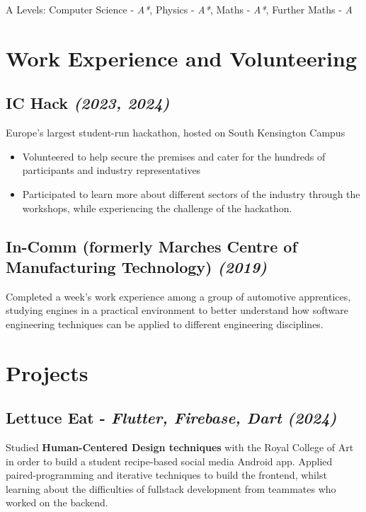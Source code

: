 \documentclass{article}
\newcommand{\dates}[1]{\hfill\textit{(#1)}}
\newcommand{\alevel}[2]{#1 - \textit{#2}}
\newcommand{\tab}{\hspace{1em}}
\newcommand{\project}[4]{
    \subsection*{\textbf{#1} - \textit{#3} \dates{#2}}\hfill
    \begin{minipage}{\dimexpr\textwidth - 1em}
        #4
    \end{minipage}
}
\begin{document}
{\tab}A Levels: 
    \alevel{Computer Science}{A*},
    \alevel{Physics}{A*},
    \alevel{Maths}{A*},
    \alevel{Further Maths}{A}



\section*{Work Experience and Volunteering}

\subsection*{\textbf{IC Hack} \dates{2023, 2024}}
{\tab}Europe's largest student-run hackathon, hosted on South Kensington Campus

\vspace{-0.75em} 
\begin{itemize}[noitemsep]
    \item Volunteered to help secure the premises and cater for the hundreds of participants and industry representatives
    \item Participated to learn more about different sectors of the industry through the workshops, 
    while experiencing the challenge of the hackathon.
\end{itemize}
\vspace{-0.75em} 


\subsection*{\textbf{In-Comm} (formerly Marches Centre of Manufacturing Technology) \dates{2019}}
{\tab}Completed a week's work experience among a group of automotive apprentices, studying engines in a practical environment to 
    better understand how software engineering techniques can be applied to different engineering disciplines.



\section*{Projects}

\project{Lettuce Eat }{2024}{Flutter, Firebase, Dart}{
    Studied \textbf{Human-Centered Design techniques} with the Royal College of Art in order to build a student recipe-based social media Android app.
    Applied paired-programming and iterative techniques to build the frontend, whilst learning about the difficulties of fullstack development
    from teammates who worked on the backend.
}
\end{document}
